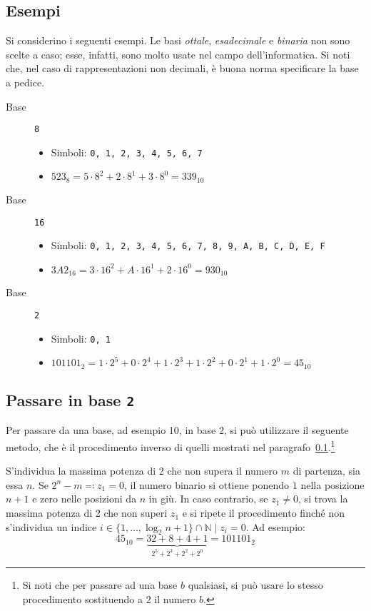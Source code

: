 		\subsection{Esempi}
		\label{subsec:BasiExamp}
Si considerino i seguenti esempi. Le basi \emph{ottale}, \emph{esadecimale} e \emph{binaria} non sono scelte a caso; esse, infatti, sono molto usate nel campo dell'informatica. Si noti che, nel caso di rappresentazioni non decimali, è buona norma specificare la base a pedice.
\begin{description}
\item[Base] \lstinline!8!
	\begin{itemize}
		\item
Simboli: \lstinline!0, 1, 2, 3, 4, 5, 6, 7!
		\item
$523_8=5\cdot8^2+2\cdot8^1+3\cdot8^0=339_{10}$
	\end{itemize}
\item[Base] \lstinline!16!
	\begin{itemize}
		\item
Simboli: \lstinline!0, 1, 2, 3, 4, 5, 6, 7, 8, 9, A, B, C, D, E, F!
		\item
$3A2_{16}=3\cdot16^2+A\cdot16^1+2\cdot16^0=930_{10}$
	\end{itemize}
\item[Base] \lstinline!2!
	\begin{itemize}
		\item
Simboli: \lstinline!0, 1!
		\item
$101101_{2}=1\cdot2^5+0\cdot2^4+1\cdot2^3+1\cdot2^2+0\cdot2^1+1\cdot2^0=45_{10}$
	\end{itemize}
\end{description}

		\subsection{Passare in base \lstinline!2!}
Per passare da una base, ad esempio \num{10}, in base \num{2}, si può utilizzare il seguente metodo, che è il procedimento inverso di quelli mostrati nel paragrafo~\ref{subsec:BasiExamp}.\footnote{Si noti che per passare ad una base $b$ qualsiasi, si può usare lo stesso procedimento sostituendo a \num{2} il numero $b$.}

S'individua la massima potenza di \num{2} che non supera il numero $m$ di partenza, sia essa $n$.
Se $2^n-m\eqqcolon z_1=0$, il numero binario si ottiene ponendo $1$ nella posizione $n+1$ e zero nelle posizioni da $n$ in giù.
In caso contrario, se $z_1\neq0$, si trova la massima potenza di \num{2} che non superi $z_1$ e si ripete il procedimento finché non s'individua un indice $i\in\{1,\dots,\log_2n+1\}\cap\mathbb{N} \mid z_{i}=0$.
Ad esempio:
\[
45_{10}=\underbrace{32+8+4+1}_{2^5+2^3+2^2+2^0}=101101_{2}
\]


